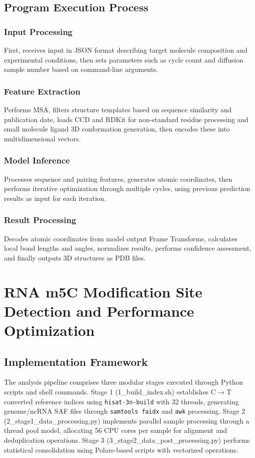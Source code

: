 \documentclass[a4paper,12pt]{article}
\begin{document}
\subsection{Program Execution Process}

\subsubsection{Input Processing}
First, receives input in JSON format describing target molecule composition and experimental conditions, then sets parameters such as cycle count and diffusion sample number based on command-line arguments.

\subsubsection{Feature Extraction}
Performs MSA, filters structure templates based on sequence similarity and publication date, loads CCD and RDKit for non-standard residue processing and small molecule ligand 3D conformation generation, then encodes these into multidimensional vectors.

\subsubsection{Model Inference}
Processes sequence and pairing features, generates atomic coordinates, then performs iterative optimization through multiple cycles, using previous prediction results as input for each iteration.

\subsubsection{Result Processing}
Decodes atomic coordinates from model output Frame Transforms, calculates local bond lengths and angles, normalizes results, performs confidence assessment, and finally outputs 3D structures as PDB files.

\newpage

\section{RNA m5C Modification Site Detection and Performance Optimization}

\subsection{Implementation Framework}
The analysis pipeline comprises three modular stages executed through Python scripts and shell commands. Stage 1 (1\_build\_index.sh) establishes C$\rightarrow$T converted reference indices using \texttt{hisat-3n-build} with 32 threads, generating genome/ncRNA SAF files through \texttt{samtools faidx} and \texttt{awk} processing. Stage 2 (2\_stage1\_data\_processing.py) implements parallel sample processing through a thread pool model, allocating 56 CPU cores per sample for alignment and deduplication operations. Stage 3 (3\_stage2\_data\_post\_processing.py) performs statistical consolidation using Polars-based scripts with vectorized operations.
\end{document}
